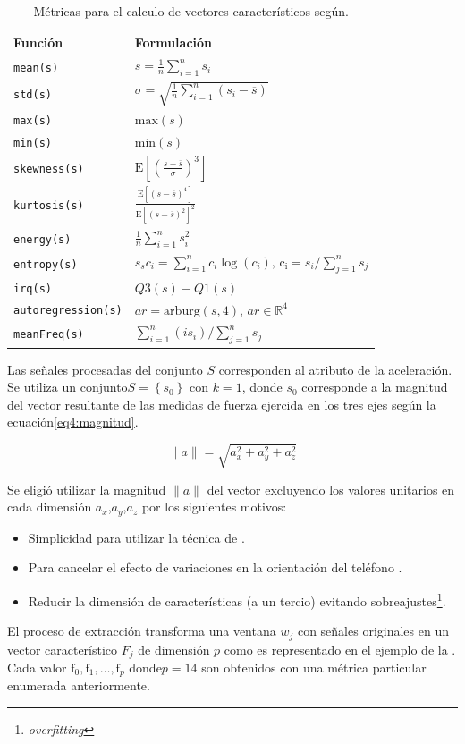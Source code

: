 \begin{table}[!tbph]
\begin{centering}
\begin{tabular}{|l|l|}
\hline 
Función & Formulación\tabularnewline
\hline 
\hline 
\texttt{mean(s)} & $\overline{s}=\frac{1}{n}\sum_{i=1}^{n}s_{i}$\tabularnewline
\hline 
\texttt{std(s)} & $\sigma=\sqrt{\frac{1}{n}\sum_{i=1}^{n}\left(s_{i}-\overline{s}\right)}$\tabularnewline
\hline 
\texttt{max(s)} & $\mathrm{max}(s)$\tabularnewline
\hline 
\texttt{min(s)} & $\mathrm{min}(s)$\tabularnewline
\hline 
\texttt{skewness(s)} & $\mathrm{E}\left[\left(\frac{s-\overline{s}}{\sigma}\right)^{3}\right]$\tabularnewline
\hline 
\texttt{kurtosis(s)} & $\frac{\mathrm{E}\left[\left(s-\overline{s}\right)^{4}\right]}{\mathrm{E}\left[\left(s-\overline{s}\right)^{2}\right]^{2}}$\tabularnewline
\hline 
\texttt{energy(s)} & $\frac{1}{n}\sum_{i=1}^{n}s_{i}^{2}$\tabularnewline
\hline 
\texttt{entropy(s)} & $s_{s}c_{i}=\sum_{i=1}^{n}c_{i}\log\left(c_{i}\right)\mathrm{\mathtt{\mathrm{,}}\,c_{i}}=s_{i}/\sum_{j=1}^{n}s_{j}$\tabularnewline
\hline 
\texttt{irq(s)} & $Q3(s)-Q1(s)$\tabularnewline
\hline 
\texttt{autoregression(s)} & $ar=\mathrm{arburg}\left(s,4\right)\mathrm{,}\,ar\in\mathbb{R}^{4}$\tabularnewline
\hline 
\texttt{meanFreq(s)} & $\sum_{i=1}^{n}\left(is_{i}\right)/\sum_{j=1}^{n}s_{j}$\tabularnewline
\hline 
\end{tabular}
\par\end{centering}
\caption[Métricas de valores característicos]{\label{tab4:metricas}Métricas para el calculo de vectores característicos
según\cite{ReyesOrtiz2015}.}
\end{table}

Las señales procesadas del conjunto $S$ corresponden al atributo
de la aceleración. Se utiliza un conjunto$S=\left\{ s_{0}\right\} $
con $k=1$, donde $s_{0}$ corresponde a la magnitud del vector resultante
de las medidas de fuerza ejercida en los tres ejes según la ecuación\ref{eq4:magnitud}.

\begin{equation}
\lVert a\rVert=\sqrt{a_{x}^{2}+a_{y}^{2}+a_{z}^{2}}\label{eq4:magnitud}
\end{equation}

Se eligió utilizar la magnitud $\lVert a\rVert$ del vector excluyendo
los valores unitarios en cada dimensión $a_{x}$,$a_{y}$,$a_{z}$
por los siguientes motivos:
\begin{itemize}
\item Simplicidad para utilizar la técnica de .
\item Para cancelar el efecto de variaciones en la orientación del teléfono
\cite{Schneider2014}.
\item Reducir la dimensión de características (a un tercio) evitando sobreajustes\footnote{\emph{overfitting}}.
\end{itemize}
El proceso de extracción transforma una ventana $w_{j}$ con señales
originales en un vector característico $F_{j}$ de dimensión $p$
como es representado en el ejemplo de la .
Cada valor $\mathrm{f}_{0},\mathrm{f}_{1},\ldots,\mathrm{f}_{p}$
donde$p=14$ son obtenidos con una métrica particular enumerada anteriormente.

